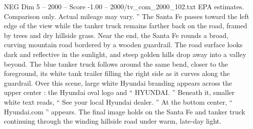 \begin{textsample}{NEG Dim 5 – 2000 – Score -1.00 – 2000/tv\_com\_2000\_102.txt}
EPA estimates.
Comparison only.
Actual mileage may vary. ” The Santa Fe passes toward the left edge of the view while the tanker truck remains farther back on the road, framed by trees and dry hillside grass.
Near the end, the Santa Fe rounds a broad, curving mountain road bordered by a wooden guardrail.
The road surface looks dark and reflective in the sunlight, and steep golden hills drop away into a valley beyond.
The blue tanker truck follows around the same bend, closer to the foreground, its white tank trailer filling the right side as it curves along the guardrail.
Over this scene, large white Hyundai branding appears across the upper center : the Hyundai oval logo and “ HYUNDAI. ” Beneath it, smaller white text reads, “ See your local Hyundai dealer. ” At the bottom center, “ Hyundai.com ” appears.
The final image holds on the Santa Fe and tanker truck continuing through the winding hillside road under warm, late-day light.

\end{textsample}
